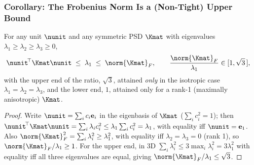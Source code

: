 \subsubsection{Corollary: The Frobenius Norm Is a (Non-Tight) Upper Bound}
\begin{corollary}
\label{cor:frobenius}
For any unit $\nunit$ and any symmetric PSD $\Kmat$ with eigenvalues
$\lambda_1\geq\lambda_2\geq\lambda_3\geq0$,
\begin{equation}
  \nunit^{\!\top}\Kmat\nunit \; \leq \; \lambda_1 \; \leq \; \norm{\Kmat}_F ,
  \qquad
  \frac{\norm{\Kmat}_F}{\lambda_1} \in [1,\sqrt3\,] ,
\end{equation}
with the upper end of the ratio, $\sqrt3$, attained \emph{only} in the
isotropic case $\lambda_1=\lambda_2=\lambda_3$, and the lower end, $1$,
attained only for a rank-1 (maximally anisotropic) $\Kmat$.
\end{corollary}
\begin{proof}
Write $\nunit=\sum_i c_i\mathbf e_i$ in the eigenbasis of $\Kmat$
($\sum_ic_i^2=1$); then $\nunit^{\!\top}\Kmat\nunit=\sum_i\lambda_ic_i^2
\leq\lambda_1\sum_ic_i^2=\lambda_1$, with equality iff $\nunit=\mathbf
e_1$. Also $\norm{\Kmat}_F^2=\sum_i\lambda_i^2\geq\lambda_1^2$, with
equality iff $\lambda_2=\lambda_3=0$ (rank 1), so $\norm{\Kmat}_F/\lambda_1
\geq1$. For the upper end, in 3D $\sum_i\lambda_i^2 \leq
3\max_i\lambda_i^2=3\lambda_1^2$ with equality iff all three eigenvalues
are equal, giving $\norm{\Kmat}_F/\lambda_1\leq\sqrt3$.
\end{proof}
